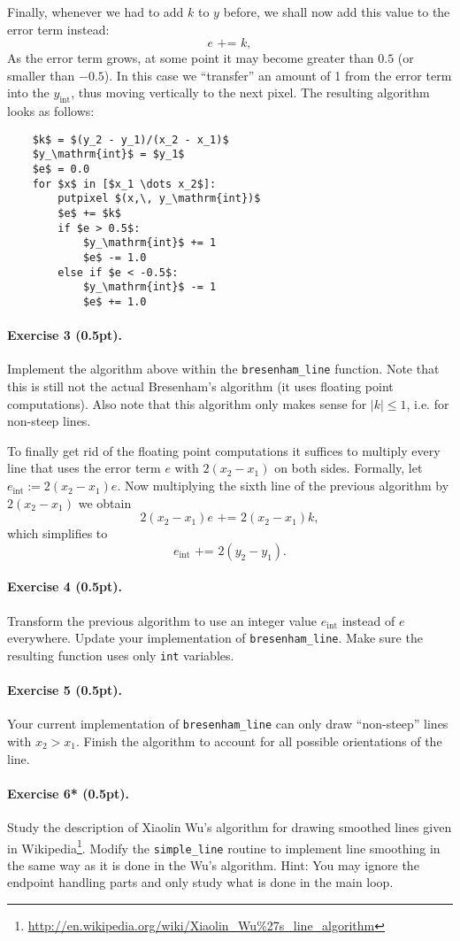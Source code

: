 \documentclass{article}
\newenvironment{exercise}[2]{\paragraph{Exercise #1 (#2pt).} }{\medskip}
\begin{document}
Finally, whenever we had to add $k$ to $y$ before, we shall now add this value to the error term instead:
$$
  e\text{ += }k,
$$
As the error term grows, at some point it may become greater than $0.5$ (or smaller than $-0.5$). In this case we ``transfer'' an amount of 1 from the error term into the $y_\mathrm{int}$, thus moving vertically to the next pixel.
The resulting algorithm looks as follows:
\begin{lstlisting}
	$k$ = $(y_2 - y_1)/(x_2 - x_1)$
	$y_\mathrm{int}$ = $y_1$
	$e$ = 0.0
	for $x$ in [$x_1 \dots x_2$]:
 		putpixel $(x,\, y_\mathrm{int})$
		$e$ += $k$
		if $e > 0.5$:
			$y_\mathrm{int}$ += 1
			$e$ -= 1.0
		else if $e < -0.5$:
			$y_\mathrm{int}$ -= 1
			$e$ += 1.0
\end{lstlisting}

\begin{exercise}{3}{0.5}
Implement the algorithm above within the \verb#bresenham_line# function. Note that this is still not the actual Bresenham's algorithm (it uses floating point computations). Also note that this algorithm only makes sense for $|k|\leq 1$, i.e. for non-steep lines.
\end{exercise}

To finally get rid of the floating point computations it suffices to multiply every line that uses the error term $e$ with $2(x_2 - x_1)$ on both sides. Formally, let $e_\mathrm{int} := 2(x_2 - x_1)e$. Now multiplying the sixth line of the previous algorithm by $2(x_2 - x_1)$ we obtain
$$
 2(x_2 - x_1)e\text{ += }2(x_2 - x_1)k,
$$
which simplifies to
$$
 e_\mathrm{int}\text{ += }2(y_2 - y_1).
$$

\begin{exercise}{4}{0.5}
Transform the previous algorithm to use an integer value $e_\mathrm{int}$ instead of $e$ everywhere. Update your implementation of \verb#bresenham_line#. Make sure the resulting function uses only \texttt{int} variables.
\end{exercise}

\begin{exercise}{5}{0.5}
Your current implementation of \verb#bresenham_line# can only draw ``non-steep'' lines with $x_2 > x_1$. Finish the algorithm to account for all possible orientations of the line.
\end{exercise}

\begin{exercise}{6*}{0.5}
Study the description of Xiaolin Wu's algorithm for drawing smoothed lines given in Wikipedia\footnote{\url{http://en.wikipedia.org/wiki/Xiaolin_Wu\%27s_line_algorithm}}. Modify the \verb#simple_line# routine to implement line smoothing in the same way as it is done in the Wu's algorithm. Hint: You may ignore the endpoint handling parts and only study what is done in the main loop.
\end{exercise}
\end{document}

